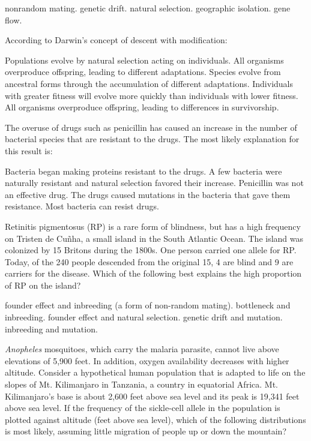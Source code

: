 \begin{choices}
\choice nonrandom mating. 
\choice genetic drift. 
\choice natural selection. 
\choice geographic isolation. 
\correctchoice gene flow. 
\end{choices}

\question
According to Darwin's concept of descent with modification:

\begin{choices}
\choice Populations evolve by natural selection acting on individuals. 
\choice All organisms overproduce offspring, leading to different adaptations. 
\correctchoice Species evolve from ancestral forms through the accumulation of different adaptations. 
\choice Individuals with greater fitness will evolve more quickly than individuals with lower fitness. 
\choice All organisms overproduce offspring, leading to differences in survivorship. 
\end{choices}

\question
The overuse of drugs such as penicillin has caused an increase in the number of bacterial species that are resistant to the drugs. The most likely explanation for this result is:

\begin{choices}
\choice Bacteria began making proteins resistant to the drugs. 
\correctchoice A few bacteria were naturally resistant and natural selection favored their increase. 
\choice Penicillin was not an effective drug. 
\choice The drugs caused mutations in the bacteria that gave them resistance. 
\choice Most bacteria can resist drugs. 
\end{choices}

\question
Retinitis pigmentosus (RP) is a rare form of blindness, but has a high frequency on Tristen de Cu\~nha, a small island in the South Atlantic Ocean.  The island was colonized by 15 Britons during the 1800s.  One person carried one allele for RP.  Today, of the 240 people descended from the original 15, 4 are blind and 9 are carriers for the disease.  Which of the following best explains the high proportion of RP on the island?

\begin{choices}
	\correctchoice founder effect and inbreeding (a form of non-random mating).
	\choice bottleneck and inbreeding.
	\choice founder effect and natural selection.
	\choice genetic drift and mutation.
	\choice inbreeding and mutation.
\end{choices}

\question
\textit{Anopheles} mosquitoes, which carry the malaria parasite, cannot live above elevations of 5,900 feet. In addition, oxygen availability decreases with higher altitude. Consider a hypothetical human population that is adapted to life on the slopes of Mt. Kilimanjaro in Tanzania, a country in equatorial Africa. Mt. Kilimanjaro's base is about 2,600 feet above sea level and its peak is 19,341 feet above sea level. If the frequency of the sickle-cell allele in the population is plotted against altitude (feet above sea level), which of the following distributions is most likely, assuming little migration of people up or down the mountain?

